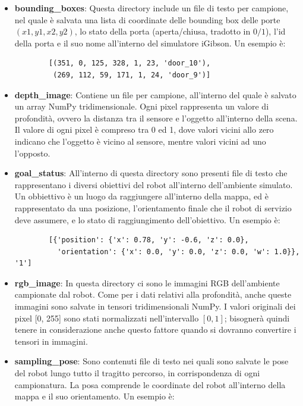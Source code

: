 \documentclass[12pt]{report}
\begin{document}
\begin{itemize}
	\item \textbf{bounding\_boxes}: Questa directory include un file di testo per campione, nel quale è salvata una lista di coordinate delle bounding box delle porte $(x1, y1, x2, y2)$, lo stato della porta (aperta/chiusa, tradotto in $0/1$), l'id della porta e il suo nome all'interno del simulatore iGibson. Un esempio è:
	
	\begin{verbatim}
		[(351, 0, 125, 328, 1, 23, 'door_10'),
		 (269, 112, 59, 171, 1, 24, 'door_9')]
	\end{verbatim}
	
	\item \textbf{depth\_image}: Contiene un file per campione, all'interno del quale è salvato un array NumPy tridimensionale. Ogni pixel rappresenta un valore di profondità, ovvero la distanza tra il sensore e l'oggetto all'interno della scena. Il valore di ogni pixel è compreso tra 0 ed 1, dove valori vicini allo zero indicano che l'oggetto è vicino al sensore, mentre valori vicini ad uno l'opposto.
	
	\item \textbf{goal\_status}: All'interno di questa directory sono presenti file di testo che rappresentano i diversi obiettivi del robot all'interno dell'ambiente simulato. Un obbiettivo è un luogo da raggiungere all'interno della mappa, ed è rappresentato da una posizione, l'orientamento finale che il robot di servizio deve assumere, e lo stato di raggiungimento dell'obiettivo. Un esempio è:
	
	\begin{verbatim}
		[{'position': {'x': 0.78, 'y': -0.6, 'z': 0.0},
		  'orientation': {'x': 0.0, 'y': 0.0, 'z': 0.0, 'w': 1.0}}, '1']
	\end{verbatim}
	
	\item \textbf{rgb\_image}: In questa directory ci sono le immagini RGB dell'ambiente campionate dal robot. Come per i dati relativi alla profondità, anche queste immagini sono salvate in tensori tridimensionali NumPy. I valori originali dei pixel [0, 255] sono stati normalizzati nell'intervallo $[0, 1]$; bisognerà quindi tenere in considerazione anche questo fattore quando si dovranno convertire i tensori in immagini.
	
	\item \textbf{sampling\_pose}: Sono contenuti file di testo nei quali sono salvate le pose del robot lungo tutto il tragitto percorso, in corrispondenza di ogni campionatura. La posa comprende le coordinate del robot all'interno della mappa e il suo orientamento. Un esempio è:
	

\end{itemize}
\end{document}
